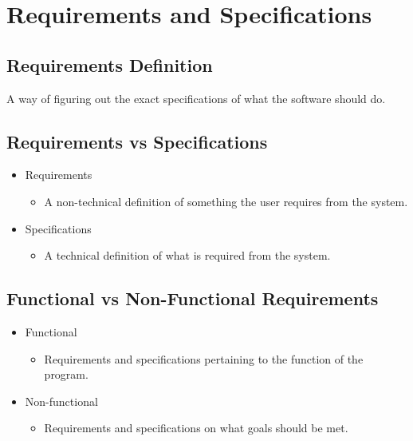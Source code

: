 \section{Requirements and Specifications}

    \subsection{Requirements Definition}

        A way of figuring out the exact specifications of what the software should do.

    \subsection{Requirements vs Specifications}
    
        \begin{itemize}
            \item Requirements
            \begin{itemize}
                \item A non-technical definition of something the user requires from the system.
            \end{itemize}
            \item Specifications
            \begin{itemize}
                \item A technical definition of what is required from the system.
            \end{itemize}
        \end{itemize}

    \subsection{Functional vs Non-Functional Requirements}

        \begin{itemize}
            \item Functional
            \begin{itemize}
                \item Requirements and specifications pertaining to the function of the program.
            \end{itemize}
            \item Non-functional
            \begin{itemize}
                \item Requirements and specifications on what goals should be met.
            \end{itemize}
        \end{itemize}


